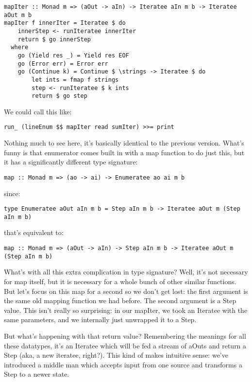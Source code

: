 \begin{lstlisting}
mapIter :: Monad m => (aOut -> aIn) -> Iteratee aIn m b -> Iteratee aOut m b
mapIter f innerIter = Iteratee $ do
    innerStep <- runIteratee innerIter
    return $ go innerStep
  where
    go (Yield res _) = Yield res EOF
    go (Error err) = Error err
    go (Continue k) = Continue $ \strings -> Iteratee $ do
        let ints = fmap f strings
        step <- runIteratee $ k ints
        return $ go step
\end{lstlisting}

We could call this like:

\begin{lstlisting}
run_ (lineEnum $$ mapIter read sumIter) >>= print
\end{lstlisting}

Nothing much to see here, it's basically identical to the previous version. What's funny is that enumerator comes built in with a map function to do just this, but it has a significantly different type signature:

\begin{lstlisting}
map :: Monad m => (ao -> ai) -> Enumeratee ao ai m b
\end{lstlisting}

since:

\begin{lstlisting}
type Enumeratee aOut aIn m b = Step aIn m b -> Iteratee aOut m (Step aIn m b)
\end{lstlisting}

that's equivalent to:

\begin{lstlisting}
map :: Monad m => (aOut -> aIn) -> Step aIn m b -> Iteratee aOut m (Step aIn m b)
\end{lstlisting}

What's with all this extra complication in type signature? Well, it's not necessary for map itself, but it is necessary for a whole bunch of other similar functions. But let's focus on this map for a second so we don't get lost: the first argument is the same old mapping function we had before. The second argument is a Step value. This isn't really so surprising: in our mapIter, we took an Iteratee with the same parameters, and we internally just unwrapped it to a Step.

But what's happening with that return value? Remembering the meanings for all these datatypes, it's an Iteratee which will be fed a stream of aOuts and return a Step (aka, a new iteratee, right?). This kind of makes intuitive sense: we've introduced a middle man which accepts input from one source and transforms a Step to a newer state.

